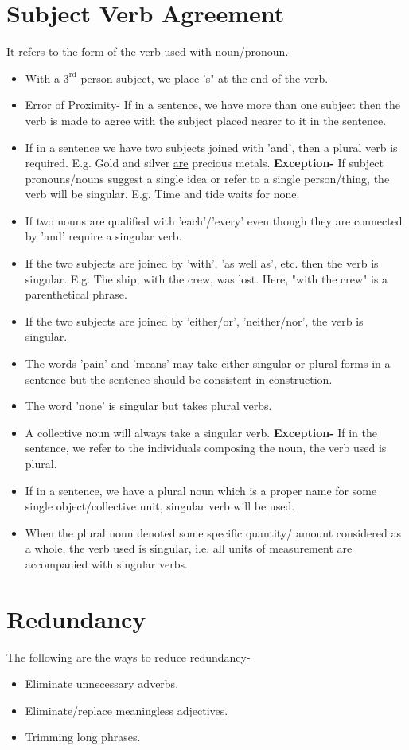 	\section{Subject Verb Agreement}
	It refers to the form of the verb used with noun/pronoun.\\
	\begin{itemize}
		\item With a $3^\text{rd}$ person subject, we place 's" at the end of the verb.
		\item Error of Proximity- If in a sentence, we have more than one subject then the verb is made to agree with the subject placed nearer to it in the sentence.
		\item If in a sentence we have two subjects joined with 'and', then a plural verb is required. E.g. Gold and silver \underline{are} precious metals. \textbf{Exception-} If subject pronouns/nouns suggest a single idea or refer to a single person/thing, the verb will be singular. E.g. Time and tide waits for none.
		\item If two nouns are qualified with 'each'/'every' even though they are connected by 'and' require a singular verb.
		\item If the two subjects are joined by 'with', 'as well as', etc. then the verb is singular. E.g. The ship, with the crew, was lost. Here, "with the crew" is a parenthetical phrase.
		\item If the two subjects are joined by 'either/or', 'neither/nor', the verb is singular.
		\item The words 'pain' and 'means' may take either singular or plural forms in a sentence but the sentence should be consistent in construction.
		\item The word 'none' is singular but takes plural verbs.
		\item A collective noun will always take a singular verb. \textbf{Exception-} If in the sentence, we refer to the individuals composing the noun, the verb used is plural.
		\item If in a sentence, we have a plural noun which is a proper name for some single object/collective unit, singular verb will be used.
		\item When the plural noun denoted some specific quantity/ amount considered as a whole, the verb used is singular, i.e. all units of measurement are accompanied with singular verbs.
	\end{itemize}
	\section{Redundancy}
	The following are the ways to reduce redundancy-
	\begin{itemize}
		\item Eliminate unnecessary adverbs.
		\item Eliminate/replace meaningless adjectives.
		\item Trimming long phrases.
	\end{itemize}

